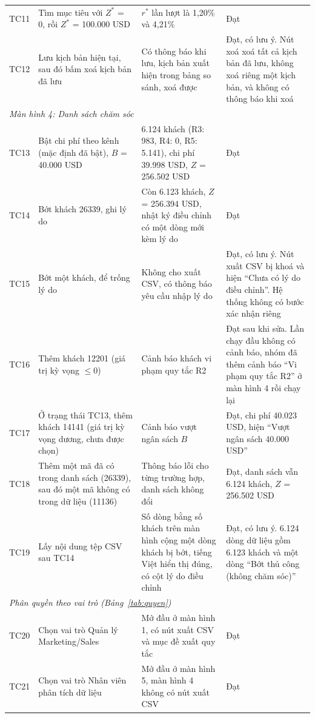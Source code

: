 {\begin{longtable}{p{0.95cm}p{4.0cm}p{4.3cm}p{5.5cm}}
TC11 & Tìm mục tiêu với $Z^{*}$ = 0, rồi $Z^{*}$ = 100.000 USD & $r^{*}$ lần lượt là 1,20\% và 4,21\% & Đạt \\
TC12 & Lưu kịch bản hiện tại, sau đó bấm xoá kịch bản đã lưu & Có thông báo khi lưu, kịch bản xuất hiện trong bảng so sánh, xoá được & Đạt, có lưu ý. Nút xoá xoá tất cả kịch bản đã lưu, không xoá riêng một kịch bản, và không có thông báo khi xoá \\
\midrule
\multicolumn{4}{l}{\textit{Màn hình 4: Danh sách chăm sóc}} \\
TC13 & Bật chi phí theo kênh (mặc định đã bật), $B$ = 40.000 USD & 6.124 khách (R3: 983, R4: 0, R5: 5.141), chi phí 39.998 USD, $Z$ = 256.502 USD & Đạt \\
TC14 & Bớt khách 26339, ghi lý do & Còn 6.123 khách, $Z$ = 256.394 USD, nhật ký điều chỉnh có một dòng mới kèm lý do & Đạt \\
TC15 & Bớt một khách, để trống lý do & Không cho xuất CSV, có thông báo yêu cầu nhập lý do & Đạt, có lưu ý. Nút xuất CSV bị khoá và hiện ``Chưa có lý do điều chỉnh''. Hệ thống không có bước xác nhận riêng \\
TC16 & Thêm khách 12201 (giá trị kỳ vọng $\leq 0$) & Cảnh báo khách vi phạm quy tắc R2 & Đạt sau khi sửa. Lần chạy đầu không có cảnh báo, nhóm đã thêm cảnh báo ``Vi phạm quy tắc R2'' ở màn hình 4 rồi chạy lại \\
TC17 & Ở trạng thái TC13, thêm khách 14141 (giá trị kỳ vọng dương, chưa được chọn) & Cảnh báo vượt ngân sách $B$ & Đạt, chi phí 40.023 USD, hiện ``Vượt ngân sách 40.000 USD'' \\
TC18 & Thêm một mã đã có trong danh sách (26339), sau đó một mã không có trong dữ liệu (11136) & Thông báo lỗi cho từng trường hợp, danh sách không đổi & Đạt, danh sách vẫn 6.124 khách, $Z$ = 256.502 USD \\
TC19 & Lấy nội dung tệp CSV sau TC14 & Số dòng bằng số khách trên màn hình cộng một dòng khách bị bớt, tiếng Việt hiển thị đúng, có cột lý do điều chỉnh & Đạt, có lưu ý. 6.124 dòng dữ liệu gồm 6.123 khách và một dòng ``Bớt thủ công (không chăm sóc)'' \\
\midrule
\multicolumn{4}{l}{\textit{Phân quyền theo vai trò (Bảng~\ref{tab:quyen})}} \\
TC20 & Chọn vai trò Quản lý Marketing/Sales & Mở đầu ở màn hình 1, có nút xuất CSV và mục đề xuất quy tắc & Đạt \\
TC21 & Chọn vai trò Nhân viên phân tích dữ liệu & Mở đầu ở màn hình 5, màn hình 4 không có nút xuất CSV & Đạt \\

\end{longtable}}

